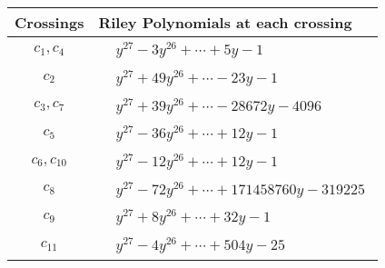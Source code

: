 \documentclass[1p]{elsarticle_modified}
\theoremstyle{definition}
\begin{document}
\begin{tabular}{m{50pt}|m{274pt}}
Crossings & \hspace{64pt}Riley Polynomials at each crossing \\
\hline $$\begin{aligned}c_{1},c_{4}\end{aligned}$$&$\begin{aligned}
&y^{27}-3 y^{26}+\cdots+5 y-1
\end{aligned}$\\
\hline $$\begin{aligned}c_{2}\end{aligned}$$&$\begin{aligned}
&y^{27}+49 y^{26}+\cdots-23 y-1
\end{aligned}$\\
\hline $$\begin{aligned}c_{3},c_{7}\end{aligned}$$&$\begin{aligned}
&y^{27}+39 y^{26}+\cdots-28672 y-4096
\end{aligned}$\\
\hline $$\begin{aligned}c_{5}\end{aligned}$$&$\begin{aligned}
&y^{27}-36 y^{26}+\cdots+12 y-1
\end{aligned}$\\
\hline $$\begin{aligned}c_{6},c_{10}\end{aligned}$$&$\begin{aligned}
&y^{27}-12 y^{26}+\cdots+12 y-1
\end{aligned}$\\
\hline $$\begin{aligned}c_{8}\end{aligned}$$&$\begin{aligned}
&y^{27}-72 y^{26}+\cdots+171458760 y-319225
\end{aligned}$\\
\hline $$\begin{aligned}c_{9}\end{aligned}$$&$\begin{aligned}
&y^{27}+8 y^{26}+\cdots+32 y-1
\end{aligned}$\\
\hline $$\begin{aligned}c_{11}\end{aligned}$$&$\begin{aligned}
&y^{27}-4 y^{26}+\cdots+504 y-25
\end{aligned}$\\
\hline
\end{tabular}\\~\\
\end{document}
